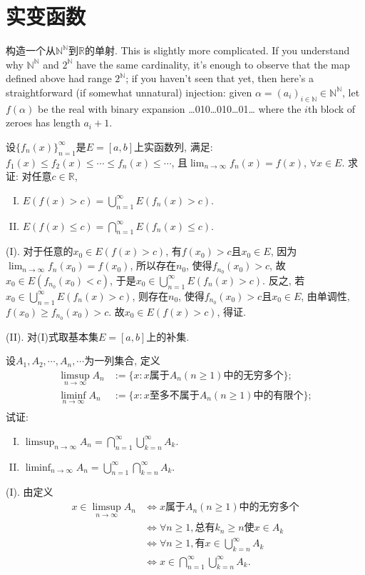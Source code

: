 \chapter{实变函数}
\bq{}{}
构造一个从$\mathbb{N}^{\mathbb{N}}$到$\mathbb{R}$的单射.
\eq
\ba
This is slightly more complicated. If you understand why $\mathbb{N}^{\mathbb{N}}$ and $2^{\mathbb{N}}$ have the 
same cardinality, it's enough to observe that the map defined above had range $2^{\mathbb{N}}$; if you haven't seen that
yet, then here's a straightforward (if somewhat unnatural) injection: given $\alpha=(a_i)_{i\in\mathbb{N}}\in\mathbb{N}^{\mathbb{N}}$,
let $f(\alpha)$ be the real with binary expansion
\ldots010\ldots010\ldots01\ldots
\eee
where the $i$th block of zeroes has length $a_i+1$.
\ea

\bq{}{}
设$\{f_n(x)\}_{n=1}^{\infty}$是$E=[a,b]$上实函数列, 满足: $f_1(x)\le f_2(x)\le\cdots\le f_n(x)\le\cdots$, 且$\lim_{n\to\infty}f_{n}(x)=f(x)$, $\forall x\in E$.
求证: 对任意$c\in\mathbb{R}$,
\begin{enumerate}[(I)]
 \item $E(f(x)>c)=\bigcup_{n=1}^{\infty}E(f_n(x)>c)$.
 \item $E(f(x)\le c)=\bigcap_{n=1}^{\infty}E(f_n(x)\le c)$.
\end{enumerate}
\eq
\ba
(I). 对于任意的$x_0\in E(f(x)>c)$, 有$f(x_0)>c$且$x_0\in E$, 因为$\lim_{n\to\infty}f_n(x_0)=f(x_0)$, 所以存在$n_0$, 使得$f_{n_0}(x_0)>c$, 
故$x_0\in E(f_{n_0}(x_0)<c)$, 于是$x_0\in\bigcup_{n=1}^{\infty}E(f_{n}(x)>c)$. 反之, 若$x_0\in\bigcup_{n=1}^{\infty}E(f_n(x)>c)$, 则存在$n_0$,
使得$f_{n_0}(x_0)>c$且$x_0\in E$, 由单调性, $f(x_0)\ge f_{n_0}(x_0)>c$. 故$x_0\in E(f(x)>c)$, 得证.

(II). 对(I)式取基本集$E=[a,b]$上的补集.
\ea

\bq{}{}
设$A_1, A_2, \cdots, A_n, \cdots$为一列集合, 定义
\begin{align*}
 \limsup_{n\to\infty}A_n & :=\{x:x\textrm{属于}A_n(n\ge1)\textrm{中的无穷多个}\};\\
 \liminf_{n\to\infty}A_n & :=\{x:x\textrm{至多不属于}A_n(n\ge1)\textrm{中的有限个}\};\\
\end{align*}
试证:
\begin{enumerate}[(I)]
 \item $\limsup_{n\to\infty}A_n=\bigcap_{n=1}^{\infty}\bigcup_{k=n}^{\infty}A_k$.
 \item $\liminf_{n\to\infty}A_{n}=\bigcup_{n=1}^{\infty}\bigcap_{k=n}^{\infty}A_k$.
\end{enumerate}
\eq
\ba
(I). 由定义
\begin{align*}
 x\in\limsup_{n\to\infty}A_n & \Longleftrightarrow x\textrm{属于}A_n(n\ge1)\textrm{中的无穷多个}\\
 & \Longleftrightarrow \forall n\ge 1, \textrm{总有}k_n\ge n\textrm{使}x\in A_k\\
 & \Longleftrightarrow \forall n\ge 1, \textrm{有}x\in\bigcup_{k=n}^{\infty}A_k\\
 & \Longleftrightarrow x\in\bigcap_{n=1}^{\infty}\bigcup_{k=n}^{\infty}A_k.
\end{align*}

